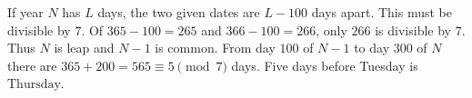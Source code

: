 If year $N$ has $L$ days, the two given dates are $L-100$ days apart. This must be divisible by $7$. Of $365-100=265$ and $366-100=266$, only $266$ is divisible by $7$. Thus $N$ is leap and $N-1$ is common. From day $100$ of $N-1$ to day $300$ of $N$ there are $365+200=565\equiv5\pmod7$ days. Five days before Tuesday is $\boxed{\text{Thursday}}$.
